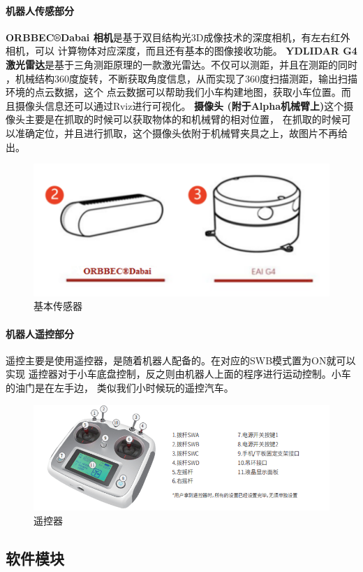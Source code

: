 \documentclass[a4paper,twoside]{article}
\begin{document}
\paragraph{机器人传感部分}
\textbf{ORBBEC®Dabai 相机}是基于双目结构光3D成像技术的深度相机，有左右红外相机，可以
计算物体对应深度，而且还有基本的图像接收功能。
\textbf{YDLIDAR G4 激光雷达}是基于三角测距原理的一款激光雷达。不仅可以测距，并且在测距的同时
，机械结构360度旋转，不断获取角度信息，从而实现了360度扫描测距，输出扫描环境的点云数据，这个
点云数据可以帮助我们小车构建地图，获取小车位置。而且摄像头信息还可以通过Rviz进行可视化。
\textbf{摄像头 (附于Alpha机械臂上)}这个摄像头主要是在抓取的时候可以获取物体的和机械臂的相对位置，
在抓取的时候可以准确定位，并且进行抓取，这个摄像头依附于机械臂夹具之上，故图片不再给出。
\begin{figure}[htbp]
	\begin{center}
		\includegraphics*[width=0.7\linewidth]{sensors.png}
		\caption{基本传感器}
	\end{center}
\end{figure}
\paragraph{机器人遥控部分}
遥控主要是使用遥控器，是随着机器人配备的。在对应的SWB模式置为ON就可以实现
遥控器对于小车底盘控制，反之则由机器人上面的程序进行运动控制。小车的油门是在左手边，
类似我们小时候玩的遥控汽车。
\begin{figure}[htbp]
	\begin{center}
		\includegraphics*[width=0.7\linewidth]{controller.png}
		\caption{遥控器}
	\end{center}
\end{figure}
\newpage
\subsection{软件模块}
\end{document}
